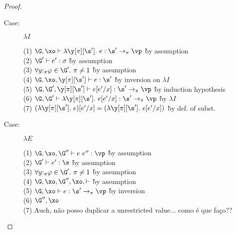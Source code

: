 \begin{proof}
\begin{description}
\item[Case:] $\lambda I$
\begin{tabbing}
  (1) $\G, \xo \vdash \lambda\y[\pi][\s'].~e : \s'\to_\pi\vp$ \` by assumption\\
  (2) $\G' \vdash e' : \sigma$ \` by assumption\\
  (3) $\hasnolinearvars{\G'}$ \` by assumption\\
  (4) $\G, \xo, \y[\pi][\s'] \vdash e : \s'$ \` by inversion on $\lambda I$\\
  (5) $\G, \G', \y[\pi][\s'] \vdash e[e'/x] : \s' \to_\pi \vp$ \` by induction hypothesis\\
  (6) $\G, \G' \vdash \lambda\y[\pi][\s'].~e[e'/x] : \s' \to_\pi\vp$ \` by $\lambda I$\\
  (7) $(\lambda \y[\pi][\s'].~e)[e'/x] = (\lambda \y[\pi][\s'].~e[e'/x])$ \` by def. of subst.\\
\end{tabbing}

\item[Case:] $\lambda E$
\begin{tabbing}
  (1) $\G, \xo, \G'' \vdash e~e'' : \vp$ \` by assumption\\
  (2) $\G' \vdash e' : \s$ \` by assumption \\
  (3) $\hasnolinearvars{\G'}$ \` by assumption\\
  (4) $\G,\xo,\G'',\xo,\vdash$ \` by assumption\\
  (5) $\G, \xo \vdash e : \s'\to_\pi\vp$ \` by inversion \\
  (6) $\G'', \xo $ \` \\
  (7) Auch, não posso duplicar a unrestricted value... como é que faço??
\end{tabbing}


\end{description}
\end{proof}
